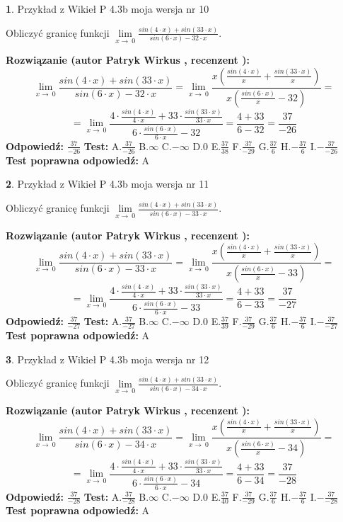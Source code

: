 \documentclass[12pt, a4paper]{article}
\theoremstyle{definition} %
\newtheorem{zad}{}
\newcommand{\zadStart}[1]{\begin{zad}#1\newline}
\newcommand{\zadStop}{\end{zad}}
\newcommand{\rozwStart}[2]{\noindent \textbf{Rozwiązanie (autor #1 , recenzent #2): }\newline}
\newcommand{\rozwStop}{\newline}
\newcommand{\odpStart}{\noindent \textbf{Odpowiedź:}\newline}
\newcommand{\odpStop}{\newline}
\newcommand{\testStart}{\noindent \textbf{Test:}\newline}
\newcommand{\testStop}{\newline}
\newcommand{\kluczStart}{\noindent \textbf{Test poprawna odpowiedź:}\newline}
\newcommand{\kluczStop}{\newline}
\begin{document}
\zadStart{Przykład z Wikieł P 4.3b moja wersja nr 10}


Obliczyć granicę funkcji $\lim\limits_{x\to\ 0}\frac{sin(4 \cdot x)+sin(33 \cdot x)}{sin(6 \cdot x)-32 \cdot x}$.
\zadStop
\rozwStart{Patryk Wirkus}{}
$$\lim\limits_{x\to\ 0}\frac{sin(4 \cdot x)+sin(33 \cdot x)}{sin(6 \cdot x)-32 \cdot x}=\lim\limits_{x\to\ 0}\frac{x(\frac{sin(4 \cdot x)}{x}+\frac{sin(33 \cdot x)}{x})}{x(\frac{sin(6 \cdot x)}{x}-32)}=$$
$$=\lim\limits_{x\to\ 0}\frac{4 \cdot \frac{sin(4 \cdot x)}{4 \cdot x}+33 \cdot \frac{sin(33 \cdot x)}{33 \cdot x}}{6 \cdot \frac{sin(6 \cdot x)}{6 \cdot x}-32}=\frac{4+33}{6-32} = \frac{37}{-26}$$
\rozwStop
\odpStart
$\frac{37}{-26}$
\odpStop
\testStart
A.$\frac{37}{-26}$
B.$\infty$
C.$-\infty$
D.$0$
E.$\frac{37}{38}$
F.$\frac{37}{-29}$
G.$\frac{37}{6}$
H.$-\frac{37}{6}$
I.$-\frac{37}{-26}$
\testStop
\kluczStart
A
\kluczStop



\zadStart{Przykład z Wikieł P 4.3b moja wersja nr 11}


Obliczyć granicę funkcji $\lim\limits_{x\to\ 0}\frac{sin(4 \cdot x)+sin(33 \cdot x)}{sin(6 \cdot x)-33 \cdot x}$.
\zadStop
\rozwStart{Patryk Wirkus}{}
$$\lim\limits_{x\to\ 0}\frac{sin(4 \cdot x)+sin(33 \cdot x)}{sin(6 \cdot x)-33 \cdot x}=\lim\limits_{x\to\ 0}\frac{x(\frac{sin(4 \cdot x)}{x}+\frac{sin(33 \cdot x)}{x})}{x(\frac{sin(6 \cdot x)}{x}-33)}=$$
$$=\lim\limits_{x\to\ 0}\frac{4 \cdot \frac{sin(4 \cdot x)}{4 \cdot x}+33 \cdot \frac{sin(33 \cdot x)}{33 \cdot x}}{6 \cdot \frac{sin(6 \cdot x)}{6 \cdot x}-33}=\frac{4+33}{6-33} = \frac{37}{-27}$$
\rozwStop
\odpStart
$\frac{37}{-27}$
\odpStop
\testStart
A.$\frac{37}{-27}$
B.$\infty$
C.$-\infty$
D.$0$
E.$\frac{37}{39}$
F.$\frac{37}{-29}$
G.$\frac{37}{6}$
H.$-\frac{37}{6}$
I.$-\frac{37}{-27}$
\testStop
\kluczStart
A
\kluczStop



\zadStart{Przykład z Wikieł P 4.3b moja wersja nr 12}


Obliczyć granicę funkcji $\lim\limits_{x\to\ 0}\frac{sin(4 \cdot x)+sin(33 \cdot x)}{sin(6 \cdot x)-34 \cdot x}$.
\zadStop
\rozwStart{Patryk Wirkus}{}
$$\lim\limits_{x\to\ 0}\frac{sin(4 \cdot x)+sin(33 \cdot x)}{sin(6 \cdot x)-34 \cdot x}=\lim\limits_{x\to\ 0}\frac{x(\frac{sin(4 \cdot x)}{x}+\frac{sin(33 \cdot x)}{x})}{x(\frac{sin(6 \cdot x)}{x}-34)}=$$
$$=\lim\limits_{x\to\ 0}\frac{4 \cdot \frac{sin(4 \cdot x)}{4 \cdot x}+33 \cdot \frac{sin(33 \cdot x)}{33 \cdot x}}{6 \cdot \frac{sin(6 \cdot x)}{6 \cdot x}-34}=\frac{4+33}{6-34} = \frac{37}{-28}$$
\rozwStop
\odpStart
$\frac{37}{-28}$
\odpStop
\testStart
A.$\frac{37}{-28}$
B.$\infty$
C.$-\infty$
D.$0$
E.$\frac{37}{40}$
F.$\frac{37}{-29}$
G.$\frac{37}{6}$
H.$-\frac{37}{6}$
I.$-\frac{37}{-28}$
\testStop
\kluczStart
A
\kluczStop
\end{document}
